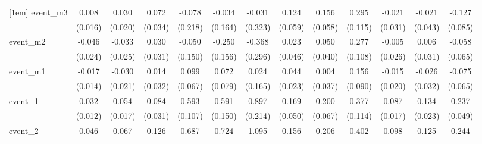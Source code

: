 {\begin{tabular}{l*{12}{c}}
[1em]
event\_m3    &       0.008         &       0.030         &       0.072\sym{*}  &      -0.078         &      -0.034         &      -0.031         &       0.124\sym{*}  &       0.156\sym{**} &       0.295\sym{*}  &      -0.021         &      -0.021         &      -0.127         \\
            &     (0.016)         &     (0.020)         &     (0.034)         &     (0.218)         &     (0.164)         &     (0.323)         &     (0.059)         &     (0.058)         &     (0.115)         &     (0.031)         &     (0.043)         &     (0.085)         \\
[1em]
event\_m2    &      -0.046         &      -0.033         &       0.030         &      -0.050         &      -0.250         &      -0.368         &       0.023         &       0.050         &       0.277\sym{*}  &      -0.005         &       0.006         &      -0.058         \\
            &     (0.024)         &     (0.025)         &     (0.031)         &     (0.150)         &     (0.156)         &     (0.296)         &     (0.046)         &     (0.040)         &     (0.108)         &     (0.026)         &     (0.031)         &     (0.065)         \\
[1em]
event\_m1    &      -0.017         &      -0.030         &       0.014         &       0.099         &       0.072         &       0.024         &       0.044         &       0.004         &       0.156         &      -0.015         &      -0.026         &      -0.075         \\
            &     (0.014)         &     (0.021)         &     (0.032)         &     (0.067)         &     (0.079)         &     (0.165)         &     (0.023)         &     (0.037)         &     (0.090)         &     (0.020)         &     (0.032)         &     (0.065)         \\
[1em]
event\_1     &       0.032\sym{**} &       0.054\sym{**} &       0.084\sym{**} &       0.593\sym{***}&       0.591\sym{***}&       0.897\sym{***}&       0.169\sym{***}&       0.200\sym{**} &       0.377\sym{***}&       0.087\sym{***}&       0.134\sym{***}&       0.237\sym{***}\\
            &     (0.012)         &     (0.017)         &     (0.031)         &     (0.107)         &     (0.150)         &     (0.214)         &     (0.050)         &     (0.067)         &     (0.114)         &     (0.017)         &     (0.023)         &     (0.049)         \\
[1em]
event\_2     &       0.046\sym{**} &       0.067\sym{**} &       0.126\sym{**} &       0.687\sym{***}&       0.724\sym{***}&       1.095\sym{***}&       0.156\sym{*}  &       0.206\sym{**} &       0.402\sym{**} &       0.098\sym{***}&       0.125\sym{***}&       0.244\sym{***}\\

\end{tabular}}
